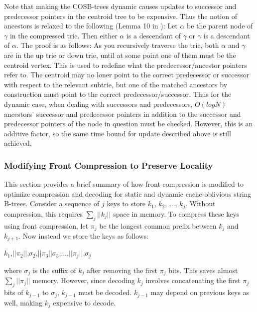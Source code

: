 \documentclass{style}
\begin{document}
Note that making the COSB-trees dynamic causes updates to successor and predecessor pointers in the centroid tree to be expensive. Thus the notion of ancestors is relaxed to the following (Lemma 10 in \cite{BenderFaKu06}): Let $\alpha$ be the parent node of $\gamma$ in the compressed trie. Then either $\alpha$ is a descendant of $\gamma$ or $\gamma$ is a descendant of $\alpha$. The proof is as follows: As you recursively traverse the trie, both $\alpha$ and $\gamma$ are in the up trie or down trie, until at some point one of them must be the centroid vertex. This is used to redefine what the predecessor/ancestor pointers refer to. The centroid may no loner point to the correct predecessor or successor with respect to the relevant subtrie, but one of the matched ancestors by construction must point to the correct predecessor/successor. Thus for the dynamic case, when dealing with successors and predecessors, $O(logN)$ ancestors' successor and predecessor pointers in addition to the successor and predecessor pointers of the node in question must be checked. However, this is an additive factor, so the same time bound for update described above is still achieved.

\subsubsection{Modifying Front Compression to Preserve Locality}
This section provides a brief summary of how front compression is modified to optimize compression and decoding for static and dynamic cache-oblivious string B-trees. Consider a sequence of $j$ keys to store $k_{1}$,  $k_{2}$, ...,  $k_{j}$. Without compression, this requires $\sum_{j}||k_{j}||$ space in memory. To compress these keys using front compression, let $\pi_{j}$ be the longest common prefix between $k_{j}$ and $k_{j+1}$. Now instead we store the keys as follows: 
\begin{center}
$k_{1}$,$||\pi_{2}||$,$\sigma_{2}$,$||\pi_{3}||$$\sigma_{3}$,...,$||\pi_{j}||$,$\sigma_{j}$
\end{center}
where $\sigma_{j}$ is the suffix of $k_{j}$ after removing the first $\pi_{j}$ bits. This saves almost $\sum_{j}||\pi_{j}||$ memory. However, since decoding $k_{j}$ involves concatenating the first $\pi_{j}$ bits of $k_{j-1}$ to $\sigma_{j}$, $k_{j-1}$ must be decoded. $k_{j-1}$ may depend on previous keys as well, making $k_{j}$ expensive to decode.
\end{document}
